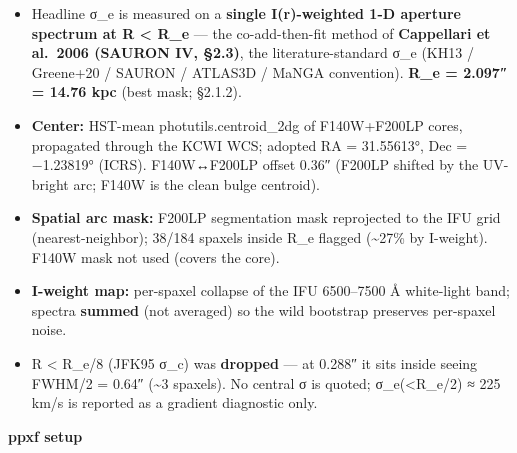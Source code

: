 \documentclass[
]{article}
\providecommand{\tightlist}{%
  \setlength{\itemsep}{0pt}\setlength{\parskip}{0pt}}
\newcommand{\BreakablePath}[1]{{\ttfamily\sloppy #1}}
\begin{document}
\begin{itemize}
\tightlist
\item
  Headline σ\_e is measured on a \textbf{single I(r)-weighted 1-D
  aperture spectrum at R \textless{} R\_e} --- the co-add-then-fit
  method of \textbf{Cappellari et al.~2006 (SAURON IV, §2.3)}, the
  literature-standard σ\_e (KH13 / Greene+20 / SAURON / ATLAS3D / MaNGA
  convention). \textbf{R\_e = 2.097″ = 14.76 kpc} (best mask; §2.1.2).
\item
  \textbf{Center:} HST-mean
  \BreakablePath{photutils.\discretionary{}{}{}centroid\_\discretionary{}{}{}2dg}
  of F140W+F200LP cores, propagated through the KCWI WCS; adopted RA =
  31.55613°, Dec = −1.23819° (ICRS). F140W↔F200LP offset 0.36″ (F200LP
  shifted by the UV-bright arc; F140W is the clean bulge centroid).
\item
  \textbf{Spatial arc mask:} F200LP segmentation mask reprojected to the
  IFU grid (nearest-neighbor); 38/184 spaxels inside R\_e flagged
  (\textasciitilde27\% by I-weight). F140W mask not used (covers the
  core).
\item
  \textbf{I-weight map:} per-spaxel collapse of the IFU 6500--7500 Å
  white-light band; spectra \textbf{summed} (not averaged) so the wild
  bootstrap preserves per-spaxel noise.
\item
  R \textless{} R\_e/8 (JFK95 σ\_c) was \textbf{dropped} --- at 0.288″
  it sits inside seeing FWHM/2 = 0.64″ (\textasciitilde3 spaxels). No
  central σ is quoted; σ\_e(\textless R\_e/2) ≈ 225 km/s is reported as
  a gradient diagnostic only.
\end{itemize}

\textbf{ppxf setup}
\end{document}
